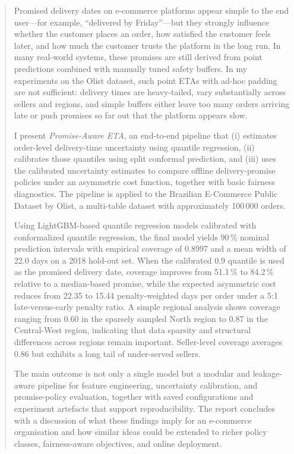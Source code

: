 \documentclass[12pt]{article}
\begin{document}
\begin{abstract}
Promised delivery dates on e-commerce platforms appear simple to the end user---for example, ``delivered by Friday''---but they strongly influence whether the customer places an order, how satisfied the customer feels later, and how much the customer trusts the platform in the long run. In many real-world systems, these promises are still derived from point predictions combined with manually tuned safety buffers. In my experiments on the Olist dataset, such point ETAs with ad-hoc padding are not sufficient: delivery times are heavy-tailed, vary substantially across sellers and regions, and simple buffers either leave too many orders arriving late or push promises so far out that the platform appears slow.

I present \emph{Promise-Aware ETA}, an end-to-end pipeline that (i) estimates order-level delivery-time uncertainty using quantile regression, (ii) calibrates those quantiles using split conformal prediction, and (iii) uses the calibrated uncertainty estimates to compare offline delivery-promise policies under an asymmetric cost function, together with basic fairness diagnostics. The pipeline is applied to the Brazilian E-Commerce Public Dataset by Olist, a multi-table dataset with approximately 100\,000 orders.

Using LightGBM-based quantile regression models calibrated with conformalized quantile regression, the final model yields 90\,\% nominal prediction intervals with empirical coverage of 0.8997 and a mean width of 22.0 days on a 2018 hold-out set. When the calibrated 0.9 quantile is used as the promised delivery date, coverage improves from 51.1\,\% to 84.2\,\% relative to a median-based promise, while the expected asymmetric cost reduces from 22.35 to 15.44 penalty-weighted days per order under a 5:1 late-versus-early penalty ratio. A simple regional analysis shows coverage ranging from 0.60 in the sparsely sampled North region to 0.87 in the Central-West region, indicating that data sparsity and structural differences across regions remain important. Seller-level coverage averages 0.86 but exhibits a long tail of under-served sellers.

The main outcome is not only a single model but a modular and leakage-aware pipeline for feature engineering, uncertainty calibration, and promise-policy evaluation, together with saved configurations and experiment artefacts that support reproducibility. The report concludes with a discussion of what these findings imply for an e-commerce organisation and how similar ideas could be extended to richer policy classes, fairness-aware objectives, and online deployment.
\end{abstract}
\end{document}
